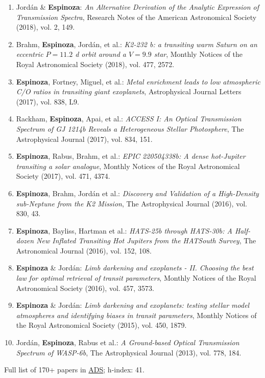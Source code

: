 \documentclass[12pt, a4paper]{article} %
\begin{document}
\begin{flushleft}
\begin{enumerate}
\item Jord\'an \& \textbf{Espinoza}: \textit{An Alternative Derivation of the Analytic Expression of Transmission Spectra}, Research Notes of the American Astronomical Society (2018), vol. 2, 149.
\item Brahm, \textbf{Espinoza}, Jord\'an, et al.: \textit{K2-232 b: a transiting warm Saturn on an eccentric $P = 11.2$ d orbit around a $V = 9.9$ star}, Monthly Notices of the Royal Astronomical Society (2018), vol. 477, 2572.
\item \textbf{Espinoza}, Fortney, Miguel, et al.: \textit{Metal enrichment leads to low atmospheric C/O ratios in transiting giant exoplanets}, Astrophysical Journal Letters (2017), vol. 838, L9.
\item Rackham, \textbf{Espinoza}, Apai, et al.: \textit{ACCESS I: An Optical Transmission Spectrum of GJ 1214b Reveals a Heterogeneous Stellar Photosphere}, The Astrophysical Journal (2017), vol. 834, 151.
\item \textbf{Espinoza}, Rabus, Brahm, et al.: \textit{EPIC 220504338b: A dense hot-Jupiter transiting a solar analogue}, Monthly Notices of the Royal Astronomical Society (2017), vol. 471, 4374.
\item \textbf{Espinoza}, Brahm, Jord\'an et al.: \textit{Discovery and Validation of a High-Density sub-Neptune from the K2 Mission}, The Astrophysical Journal (2016), vol. 830, 43.
\item \textbf{Espinoza}, Bayliss, Hartman et al.: \textit{HATS-25b through HATS-30b: A Half-dozen New Inflated Transiting Hot Jupiters from the HATSouth Survey}, The Astronomical Journal (2016), vol. 152, 108.
\item \textbf{Espinoza} \& Jord\'an: \textit{Limb darkening and exoplanets - II. Choosing the best law for optimal retrieval of transit parameters}, Monthly Notices of the Royal Astronomical Society (2016), vol. 457, 3573.
\item \textbf{Espinoza} \& Jord\'an: \textit{Limb darkening and exoplanets: testing stellar model atmospheres and identifying biases in transit parameters}, Monthly Notices of the Royal Astronomical Society (2015), vol. 450, 1879.
\item Jord\'an, \textbf{Espinoza}, Rabus et al.: \textit{A Ground-based Optical Transmission Spectrum of WASP-6b}, The Astrophysical Journal (2013), vol. 778, 184.
\end{enumerate}

Full list of 170+ papers in \href{https://ui.adsabs.harvard.edu/public-libraries/JAL40dT5ToGup2Omjvc3Ag}{ADS}; h-index: 41.

\end{flushleft}
\end{document}
